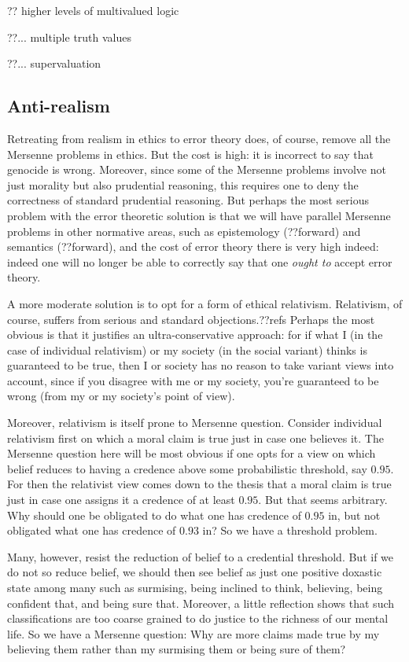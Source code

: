 ?? higher levels of multivalued logic

??... multiple truth values

??... supervaluation
\subsection{Anti-realism}
Retreating from realism in ethics to error theory does, of course, remove all the Mersenne problems in ethics. But the
cost is high: it is incorrect to say that genocide is wrong. Moreover, since some of the Mersenne problems involve not
just morality but also prudential reasoning, this requires one to deny the correctness of standard prudential reasoning.
But perhaps the most serious problem with the error theoretic solution is that we will have parallel Mersenne problems
in other normative areas, such as epistemology (??forward) and semantics (??forward), and the cost of error theory 
there is very high indeed: indeed one will no longer  be able to correctly say that one \textit{ought to} accept error theory.

A more moderate solution is to opt for a form of ethical relativism. Relativism, of course, suffers from serious and
standard objections.??refs Perhaps the most obvious is that it justifies an ultra-conservative approach: for if what
I (in the case of individual relativism) or my society (in the social variant) thinks is guaranteed to be true, then
I or society has no reason to take variant views into account, since if you disagree with me or my society, you're guaranteed to be 
wrong (from my or my society's point of view).

Moreover, relativism is itself prone to
Mersenne question. Consider individual relativism first on which a moral claim is true just in case one believes
it. The Mersenne question here will be most obvious if one opts for a view on which belief reduces to having a
credence above some probabilistic threshold, say $0.95$. For then the relativist view comes down to the thesis
that a moral claim is true just in case one assigns it a credence of at least $0.95$. But that seems arbitrary.
Why should one be obligated to do what one has credence of $0.95$ in, but not obligated what one has credence of $0.93$ in?
So we have a threshold problem.

Many, however, resist the reduction of belief to a credential threshold. But if we do not so reduce belief, we should
then see belief as just one positive doxastic state among many such as surmising, being inclined to think, believing,
being confident that, and being sure that. Moreover, a little reflection shows that
such classifications are too coarse grained to do justice to the richness of our mental life. So we have a Mersenne
question: Why are more claims made true by my believing them rather than my surmising them or being sure of them?

